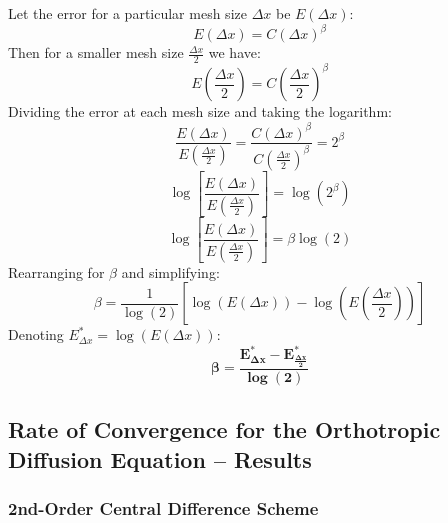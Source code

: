 \documentclass[10pt]{article}		%
\numberwithin{equation}{section}
\begin{document}
Let the error for a particular mesh size $\Delta x$ be $E\left(\Delta x\right)$:
\begin{equation}
E\left(\Delta x\right) = C\left(\Delta x\right)^\beta
\end{equation}
Then for a smaller mesh size $\frac{\Delta x}{2}$ we have:
\begin{equation}
E\left(\frac{\Delta x}{2}\right) = C\left(\frac{\Delta x}{2}\right)^\beta
\end{equation}
Dividing the error at each mesh size and taking the logarithm:
\begin{equation}
\frac{E\left(\Delta x\right)}{E\left(\frac{\Delta x}{2}\right)} = \frac{C\left(\Delta x\right)^\beta}{C\left(\frac{\Delta x}{2}\right)^\beta} = 2^\beta
\end{equation}
\begin{equation}
\log\left[\frac{E\left(\Delta x\right)}{E\left(\frac{\Delta x}{2}\right)}\right] = \log(2^\beta)
\end{equation}
\begin{equation}
\log\left[\frac{E\left(\Delta x\right)}{E\left(\frac{\Delta x}{2}\right)}\right] = \beta \log(2)
\end{equation}
Rearranging for $\beta$ and simplifying:
\begin{equation}
\beta = \frac{1}{\log(2)} \left[\log\left(E\left(\Delta x\right)\right) - \log\left(E\left(\frac{\Delta x}{2}\right)\right)\right] 
\end{equation}
Denoting $E^*_{\Delta x} = \log\left(E\left(\Delta x\right)\right)$:
\begin{equation}
\mathbf{\beta = \frac{E^*_{\Delta x} - E^*_{\frac{\Delta x}{2}}}{\log (2)}}
\end{equation}

\newpage

\subsection{Rate of Convergence for the Orthotropic Diffusion Equation -- Results}

\subsubsection{2nd-Order Central Difference Scheme}
\end{document}
